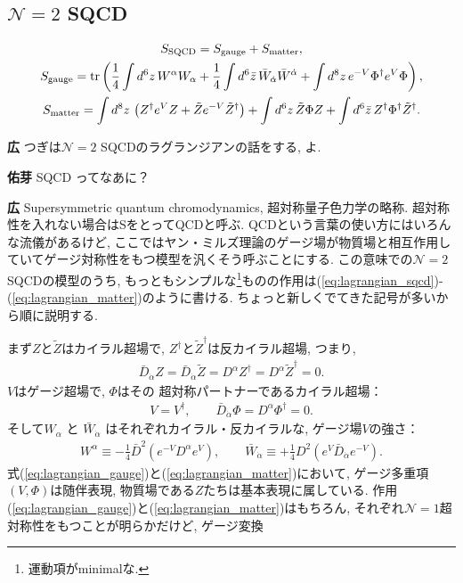 \documentclass{ltjsarticle}
\theoremstyle{definition}
\newcommand{\parno}{\par\noindent}
\begin{document}
\subsection{$\mathcal N=2$ SQCD\label{subsection:N=2_SQCD}}
\begin{tcolorbox}
\begin{gather}
S_{\mathrm{SQCD}}=S_{\mathrm{gauge}}+S_{\mathrm{matter}},\label{eq:lagrangian_sqcd}\\
S_{\mathrm{gauge}}=\tr\left(\frac14\int d^6z\,W^\alpha W_\alpha+\frac14\int d^6\bar z\,\bar W_{\dot\alpha}\bar W^{\dot\alpha}+\int d^8z\,e^{-V}\Phi^\dagger e^V\Phi\right),\label{eq:lagrangian_gauge}\\
S_{\mathrm{matter}}=\int d^8z\,\left(Z^\dagger e^VZ+\tilde Ze^{-V}\tilde Z^\dagger\right)+\int d^6z\,\tilde Z\Phi Z+\int d^6\bar z\,Z^\dagger\Phi^\dagger\tilde Z^\dagger.\label{eq:lagrangian_matter}
\end{gather}
\end{tcolorbox}
\parno
\textbf{広} つぎは$\mathcal N=2$ SQCDのラグランジアンの話をする, よ.\parno
\textbf{佑芽} SQCD ってなあに？\parno
\textbf{広} Supersymmetric quantum chromodynamics, 超対称量子色力学の略称. 超対称性を入れない場合はSをとってQCDと呼ぶ. QCDという言葉の使い方にはいろんな流儀があるけど, ここではヤン・ミルズ理論のゲージ場が物質場と相互作用していてゲージ対称性をもつ模型を汎くそう呼ぶことにする. この意味での$\mathcal N=2$ SQCDの模型のうち, もっともシンプルな\footnote{運動項がminimalな.}ものの作用は(\ref{eq:lagrangian_sqcd})-(\ref{eq:lagrangian_matter})のように書ける. ちょっと新しくでてきた記号が多いから順に説明する.\par
まず$Z$と$\tilde Z$はカイラル超場で, $Z^\dagger$と$\tilde Z^\dagger$は反カイラル超場, つまり,
\begin{gather}
\bar D_{\dot\alpha}Z=\bar D_{\dot\alpha}\tilde Z=D^\alpha Z^\dagger=D^\alpha\tilde Z^\dagger=0.
\end{gather}
$V$はゲージ超場で, $\Phi$はその
超対称パートナーであるカイラル超場：
\begin{gather}
V=V^\dagger,\qquad\bar D_{\dot\alpha}\Phi=D^\alpha\Phi^\dagger=0.
\end{gather}
そして$W_\alpha$ と $\bar W_{\dot\alpha}$ はそれぞれカイラル・反カイラルな, ゲージ場$V$の強さ：
\begin{gather}
W^\alpha\equiv-\frac14\bar D^2\left(e^{-V}D^\alpha e^V\right),\qquad\bar W_{\dot\alpha}\equiv+\frac14D^2\left(e^V\bar D_{\dot\alpha}e^{-V}\right).
\end{gather}
式(\ref{eq:lagrangian_gauge})と(\ref{eq:lagrangian_matter})において, ゲージ多重項 $(V,\Phi)$は随伴表現, 物質場である$Z$たちは基本表現に属している. 作用(\ref{eq:lagrangian_gauge})と(\ref{eq:lagrangian_matter})はもちろん, それぞれ$\mathcal N=1$超対称性をもつことが明らかだけど, ゲージ変換
\end{document}
